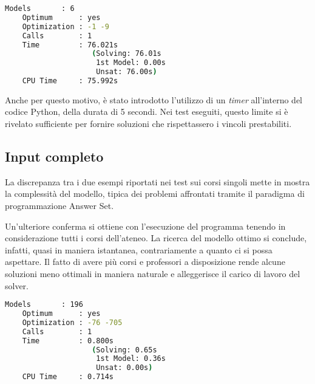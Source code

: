 \begin{lstlisting}[language=bash, captionpos=b, 
    caption={Statistiche clingo per il corso 3024.}, 
    label={lst:stat_3024},
    backgroundcolor=\color{lightgray!20},
    basicstyle=\ttfamily\footnotesize]
    Models       : 6
    Optimum      : yes
    Optimization : -1 -9
    Calls        : 1
    Time         : 76.021s 
                    (Solving: 76.01s 
                     1st Model: 0.00s 
                     Unsat: 76.00s)
    CPU Time     : 75.992s
\end{lstlisting}

Anche per questo motivo, è stato introdotto l'utilizzo di un \textit{timer} all'interno 
del codice Python, della durata di 5 secondi.
Nei test eseguiti, questo limite si è rivelato sufficiente per fornire soluzioni 
che rispettassero i vincoli prestabiliti.

\subsection{Input completo}
La discrepanza tra i due esempi riportati nei test sui corsi singoli mette in 
mostra la complessità del modello, tipica dei problemi affrontati tramite il 
paradigma di programmazione Answer Set.

Un'ulteriore conferma si ottiene con l'esecuzione del programma tenendo in 
considerazione tutti i corsi dell'ateneo. La ricerca del modello ottimo 
si conclude, infatti, quasi in maniera istantanea, contrariamente a quanto 
ci si possa aspettare.
Il fatto di avere più corsi e professori a disposizione rende alcune soluzioni 
meno ottimali in maniera naturale e alleggerisce il carico di lavoro del solver.

\begin{lstlisting}[language=bash, captionpos=b, 
    caption={Statistiche clingo per tutti i corsi.}, 
    label={lst:stat_all},
    backgroundcolor=\color{lightgray!20},
    basicstyle=\ttfamily\footnotesize]
    Models       : 196
    Optimum      : yes
    Optimization : -76 -705
    Calls        : 1
    Time         : 0.800s 
                    (Solving: 0.65s 
                     1st Model: 0.36s 
                     Unsat: 0.00s)
    CPU Time     : 0.714s
\end{lstlisting}

